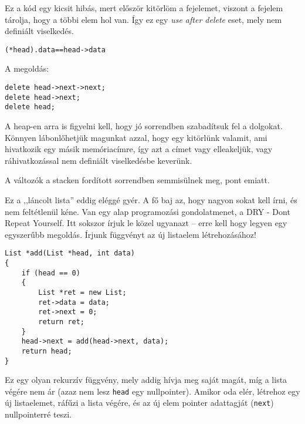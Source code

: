 \documentclass[a4paper,11.5pt]{article}
\begin{document}
	Ez a kód egy kicsit hibás, mert először kitörlöm a fejelemet, viszont a fejelem tárolja, hogy a többi elem hol van. Így ez egy \textit{use after delete} eset, mely nem definiált viselkedés.
	\begin{center}
		\texttt{(*head).data\quad ==\quad head->data}
	\end{center}
	A megoldás:
	\begin{lstlisting}
delete head->next->next;
delete head->next;
delete head;
	\end{lstlisting}
	\begin{note}
		A heap-en arra is figyelni kell, hogy jó sorrendben szabadítsuk fel a dolgokat. Könnyen lábonlőhetjük magunkat azzal, hogy egy kitörlünk valamit, ami hivatkozik egy másik memóriacímre, így azt a címet vagy elleakeljük, vagy ráhivatkozással nem definiált viselkedésbe keverünk.
	\end{note}
	A változók a stacken fordított sorrendben semmisülnek meg, pont emiatt.
	\medskip
	
	Ez a ,,láncolt lista'' eddig eléggé gyér. A fő baj az, hogy nagyon sokat kell írni, és nem feltétlenül kéne. Van egy alap programozási gondolatmenet, a 
	DRY - Dont Repeat Yourself. Itt sokszor írjuk le közel ugyanazt -- erre kell hogy legyen egy egyszerűbb megoldás. Írjunk függvényt az új listaelem létrehozásához!
	\begin{lstlisting}
List *add(List *head, int data)
{
	if (head == 0)
	{
		List *ret = new List;
		ret->data = data;
		ret->next = 0;
		return ret;
	}
	head->next = add(head->next, data);
	return head;
}
	\end{lstlisting}
	Ez egy olyan rekurzív függvény, mely addig hívja meg saját magát, míg a lista végére nem ár (azaz nem lesz \texttt{head} egy nullpointer). Amikor oda elér, létrehoz egy új listaelemet, ráfűzi a lista végére, és az új elem pointer adattagját (\texttt{next}) nullpointerré teszi.
	\medskip
	
\end{document}
